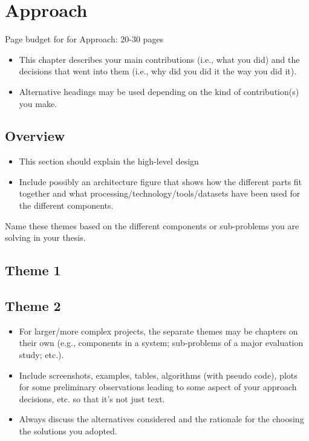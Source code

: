 \chapter{Approach}
\label{ch:approach}
Page budget for for Approach: 20-30 pages
\begin{itemize}
    \item This chapter describes your main contributions (i.e., what you did) and the decisions that went into them (i.e., why did you did it the way you did it).
    \item Alternative headings may be used depending on the kind of contribution(s) you make.
\end{itemize}

\section{Overview}
\begin{itemize}
    \item This section should explain the high-level design
    \item Include possibly an architecture figure that shows how the different parts fit together and what processing/technology/tools/datasets have been used for the different components.
\end{itemize}
    
    Name these themes based on the different components or sub-problems you are solving in your thesis.
    
    \section{Theme 1}
    \section{Theme 2}
    
    \begin{itemize}
    \item For larger/more complex projects, the separate themes may be chapters on their own (e.g., components in a system; sub-problems of a major evaluation study; etc.).
    \item Include screenshots, examples, tables, algorithms (with pseudo code), plots for some preliminary observations leading to some aspect of your approach decisions, etc. so that it's not just text.
    \item Always discuss the alternatives considered and the rationale for the choosing the solutions you adopted.
\end{itemize}
    